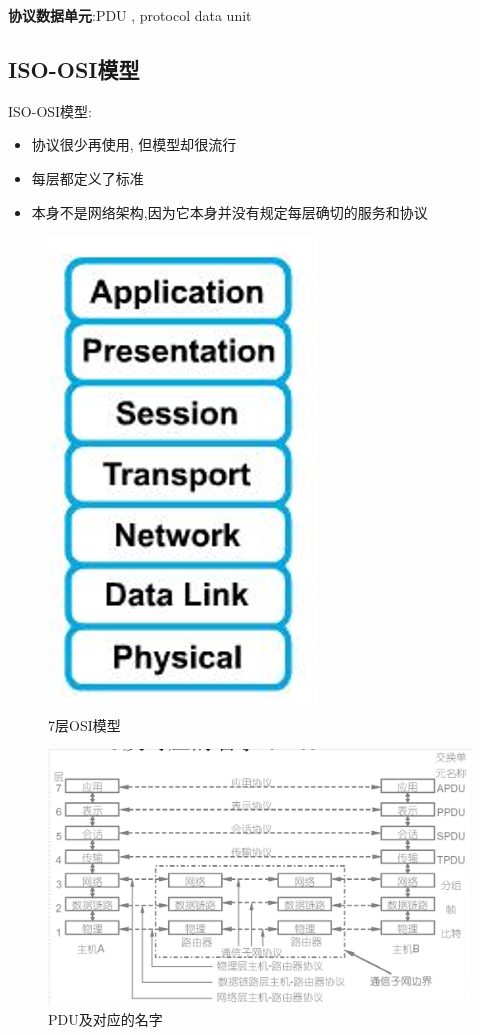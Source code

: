 \documentclass[UTF8,a4paper]{ctexart}
\begin{document}
  \textbf{协议数据单元}:PDU , protocol data unit

  \subsection{ISO-OSI模型}
  ISO-OSI模型:
  \begin{itemize}
    \item 协议很少再使用, 但模型却很流行
    \item 每层都定义了标准
    \item 本身不是网络架构,因为它本身并没有规定每层确切的服务和协议
  \end{itemize}
  \begin{figure}[H]
    \centering
    \includegraphics[scale = 0.3]{assets/jisuanjiwangluo_492ef.png}
    \caption{7层OSI模型}
  \end{figure}

  \begin{figure}[H]
    \centering
    \includegraphics[scale = 0.3]{assets/jisuanjiwangluo_63c15.png}
    \caption{PDU及对应的名字}
  \end{figure}
\end{document}
